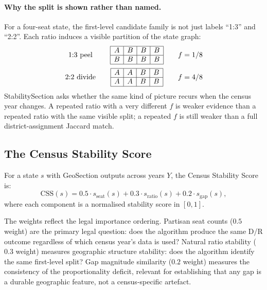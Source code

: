 \paragraph{Why the split is shown rather than named.}
For a four-seat state, the first-level candidate family is not just labels
``1:3'' and ``2:2''.  Each ratio induces a visible partition of the state graph:
\[
\begin{array}{c@{\qquad}c@{\qquad}c}
\text{1:3 peel} &
\begin{array}{|c|c|c|c|}
\hline
A & B & B & B\\
\hline
B & B & B & B\\
\hline
\end{array}
&
f=1/8\\[1.2em]
\text{2:2 divide} &
\begin{array}{|c|c|c|c|}
\hline
A & A & B & B\\
\hline
A & A & B & B\\
\hline
\end{array}
&
f=4/8
\end{array}
\]
StabilitySection asks whether the same kind of picture recurs when the census
year changes.  A repeated ratio with a very different $f$ is weaker evidence
than a repeated ratio with the same visible split; a repeated $f$ is still
weaker than a full district-assignment Jaccard match.

\subsection{The Census Stability Score}
\label{sec:css-definition}

\begin{definition}
For a state $s$ with GeoSection outputs across years $Y$, the
Census Stability Score is:
\[
  \mathrm{CSS}(s) = 0.5 \cdot s_{\text{seat}}(s)
                  + 0.3 \cdot s_{\text{ratio}}(s)
                  + 0.2 \cdot s_{\text{gap}}(s),
\]
where each component is a normalised stability score in $[0,1]$.
\end{definition}

The weights reflect the legal importance ordering.
Partisan seat counts ($0.5$ weight) are the primary legal question: does the
algorithm produce the same D/R outcome regardless of which census year's data
is used?
Natural ratio stability ($0.3$ weight) measures geographic structure
stability: does the algorithm identify the same first-level split?
Gap magnitude similarity ($0.2$ weight) measures the consistency of the
proportionality deficit, relevant for establishing that any gap is a durable
geographic feature, not a census-specific artefact.

